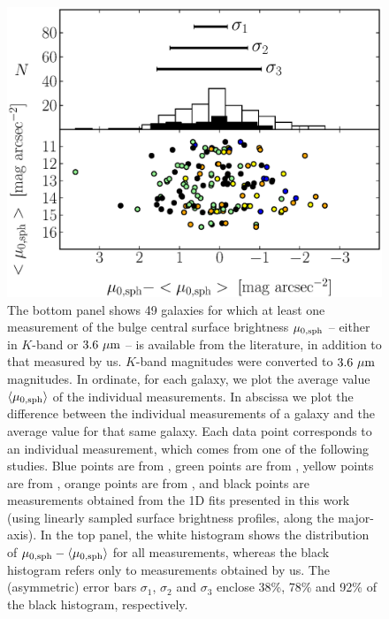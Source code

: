 \documentclass[preprint2]{emulateapj}
\begin{document}
\begin{figure}%
\begin{center}
\includegraphics[width=1.1\columnwidth]{images/comparison_all_mu_0.eps} 
\caption{The bottom panel shows 49 galaxies for which at least one measurement 
of the bulge central surface brightness $\mu_{\rm 0,sph}$ -- either in $K$-band or $3.6~\rm \mu m$ -- is available 
from the literature, in addition to that measured by us. 
$K$-band magnitudes were converted to $3.6~\rm \mu m$ magnitudes.
In ordinate, for each galaxy, we plot the average value $\langle \mu_{\rm 0,sph} \rangle$ 
of the individual measurements. 
In abscissa we plot the difference between the individual measurements of a galaxy 
and the average value for that same galaxy.
Each data point corresponds to an individual measurement, 
which comes from one of the following studies. 
Blue points are from \cite{laurikainen2010}, green points are from \cite{sani2011}, 
yellow points are from \cite{vika2012}, 
orange points are from \cite{lasker2014data},
and black points are measurements obtained from the 1D fits presented in this work 
(using linearly sampled surface brightness profiles, along the major-axis).
In the top panel, the white histogram shows the distribution of $\mu_{\rm 0,sph} - \langle \mu_{\rm 0,sph} \rangle$ 
for all measurements, 
whereas the black histogram refers only to measurements obtained by us.
The (asymmetric) error bars $\sigma_1$, $\sigma_2$ and $\sigma_3$ enclose 38\%, 78\% and 92\% 
of the black histogram, respectively.}
\label{fig:compmu0}
\end{center}
\end{figure}
\end{document}
